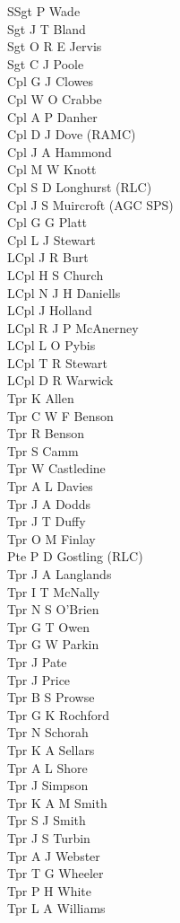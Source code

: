 \begin{multicols}{2}
  \noindent
  SSgt P Wade \\
  Sgt J T Bland \\
  Sgt O R E Jervis \\
  Sgt C J Poole \\
  Cpl G J Clowes \\
  Cpl W O Crabbe \\
  Cpl A P Danher \\
  Cpl D J Dove (RAMC) \\
  Cpl J A Hammond \\
  Cpl M W Knott \\
  Cpl S D Longhurst (RLC) \\
  Cpl J S Muircroft (AGC SPS) \\
  Cpl G G Platt \\
  Cpl L J Stewart \\
  LCpl J R Burt \\
  LCpl H S Church \\
  LCpl N J H Daniells \\
  LCpl J Holland \\
  LCpl R J P McAnerney \\
  LCpl L O Pybis \\
  LCpl T R Stewart \\
  LCpl D R Warwick \\
  Tpr K Allen \\
  Tpr C W F Benson \\
  Tpr R Benson \\
  Tpr S Camm \\
  Tpr W Castledine \\
  Tpr A L Davies \\
  Tpr J A Dodds \\
  Tpr J T Duffy \\
  Tpr O M Finlay \\
  Pte P D Gostling (RLC) \\
  Tpr J A Langlands \\
  Tpr I T McNally \\
  Tpr N S O'Brien \\
  Tpr G T Owen \\
  Tpr G W Parkin \\
  Tpr J Pate \\
  Tpr J Price \\
  Tpr B S Prowse \\
  Tpr G K Rochford \\
  Tpr N Schorah \\
  Tpr K A Sellars \\
  Tpr A L Shore \\
  Tpr J Simpson \\
  Tpr K A M Smith \\
  Tpr S J Smith \\
  Tpr J S Turbin \\
  Tpr A J Webster \\
  Tpr T G Wheeler \\
  Tpr P H White \\
  Tpr L A Williams \\
\end{multicols}

